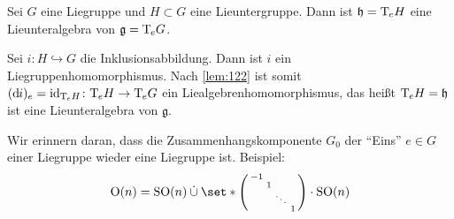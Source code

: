 \begin{lemma}[{name=[Lieunteralgebra zu einer Lieuntergruppe]}]
	Sei $G$ eine Liegruppe und $H \subset G$ eine Lieuntergruppe.
	Dann ist $\mathfrak{h} = \mathrm{T}\mkern-0.85mu_e H$ eine Lieunteralgebra von $\mathfrak{g} = \mathrm{T}\mkern-0.85mu_e G$.
\end{lemma}
\begin{beweis}
	Sei $i \colon H \hookrightarrow G$ die Inklusionsabbildung.
	Dann ist $i$ ein Liegruppenhomomorphismus.
	Nach \autoref{lem:122} ist somit $(\mathrm{d}\mkern-1.0mu i)_e = \operatorname{id}_{\mathrm{T}\mkern-0.85mu_e H} \colon \mathrm{T}\mkern-0.85mu_e H \to \mathrm{T}\mkern-0.85mu_e G$ ein Liealgebrenhomomorphismus, das heißt $\mathrm{T}\mkern-0.85mu_e H = \mathfrak{h}$ ist eine Lieunteralgebra von $\mathfrak{g}$.
\end{beweis}

Wir erinnern daran, dass die Zusammenhangskomponente $G_0$ der \enquote{Eins} $e \in G$ einer Liegruppe wieder eine Liegruppe ist.
Beispiel: 
\[
	\On(n)= \SO(n) \mathbin{\dot{\cup}} \set*{ \begin{psmallmatrix}
		-1 & & &\\
		& 1 &  &\\
		& & \ddots & \\
		& & & 1
	\end{psmallmatrix} \cdot \SO(n)}
\]

